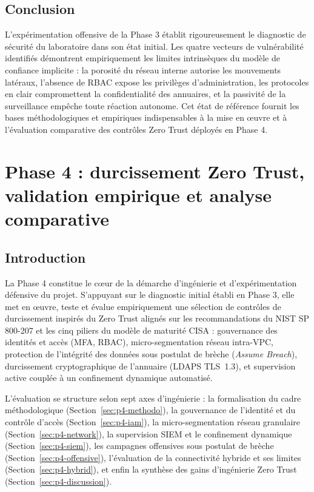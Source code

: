 \documentclass[a4paper,12pt]{report}
\begin{document}
\section*{Conclusion}
L'expérimentation offensive de la Phase 3 établit rigoureusement le diagnostic de sécurité du laboratoire dans son état initial. Les quatre vecteurs de vulnérabilité identifiés démontrent empiriquement les limites intrinsèques du modèle de confiance implicite : la porosité du réseau interne autorise les mouvements latéraux, l'absence de RBAC expose les privilèges d'administration, les protocoles en clair compromettent la confidentialité des annuaires, et la passivité de la surveillance empêche toute réaction autonome. Cet état de référence fournit les bases méthodologiques et empiriques indispensables à la mise en œuvre et à l'évaluation comparative des contrôles Zero Trust déployés en Phase 4.
\chapter{Phase 4 : durcissement Zero Trust, validation empirique et analyse comparative}
\section*{Introduction}
La Phase 4 constitue le cœur de la démarche d'ingénierie et d'expérimentation défensive du projet. S'appuyant sur le diagnostic initial établi en Phase 3, elle met en œuvre, teste et évalue empiriquement une sélection de contrôles de durcissement inspirés du Zero Trust alignés sur les recommandations du NIST SP 800-207 et les cinq piliers du modèle de maturité CISA \cite{cisa_ztmm} : gouvernance des identités et accès (MFA, RBAC), micro-segmentation réseau intra-VPC, protection de l'intégrité des données sous postulat de brèche (\textit{Assume Breach}), durcissement cryptographique de l'annuaire (LDAPS TLS~1.3), et supervision active couplée à un confinement dynamique automatisé.

L'évaluation se structure selon sept axes d'ingénierie : la formalisation du cadre méthodologique (Section~\ref{sec:p4-methodo}), la gouvernance de l'identité et du contrôle d'accès (Section~\ref{sec:p4-iam}), la micro-segmentation réseau granulaire (Section~\ref{sec:p4-network}), la supervision SIEM et le confinement dynamique (Section~\ref{sec:p4-siem}), les campagnes offensives sous postulat de brèche (Section~\ref{sec:p4-offensive}), l'évaluation de la connectivité hybride et ses limites (Section~\ref{sec:p4-hybrid}), et enfin la synthèse des gains d'ingénierie Zero Trust (Section~\ref{sec:p4-discussion}).
\end{document}
